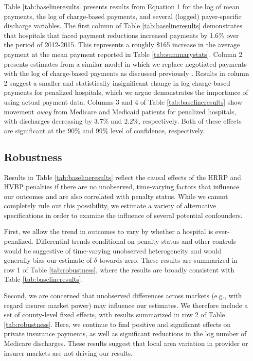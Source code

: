 \documentclass[12pt]{article}
\begin{document}
Table \ref{tab:baselineresults} presents results from Equation 1 for the log of mean payments, the log of charge-based payments, and several (logged) payer-specific discharge variables. The first column of Table \ref{tab:baselineresults} demonstrates that hospitals that faced payment reductions increased payments by 1.6$\%$ over the period of 2012-2015.  This represents a roughly $\$$165 increase in the average payment at the mean payment reported in Table \ref{tab:summarystats}.  Column 2 presents estimates from a similar model in which we replace negotiated payments with the log of charge-based payments as discussed previously \citep{dafny2009,lewis2015,schmitt2017,dranove2017}. Results in column 2 suggest a smaller and statistically insignificant change in log charge-based payments for penalized hospitals, which we argue demonstrates the importance of using actual payment data.  Columns 3 and 4 of Table \ref{tab:baselineresults} show movement \textit{away} from Medicare and Medicaid patients for penalized hospitals, with discharges decreasing by 3.7$\%$ and 2.2$\%$, respectively.  Both of these effects are significant at the 90$\%$ and 99\% level of confidence, respectively.

\subsection{Robustness}
Results in Table \ref{tab:baselineresults} reflect the causal effects of the HRRP and HVBP penalties if there are no unobserved, time-varying factors that influence our outcomes and are also correlated with penalty status.  While we cannot completely rule out this possibility, we estimate a variety of alternative specifications in order to examine the influence of several potential confounders.

First, we allow the trend in outcomes to vary by whether a hospital is ever-penalized. Differential trends conditional on penalty status and other controls would be suggestive of time-varying unobserved heterogeneity and would generally bias our estimate of $\delta$ towards zero.  These results are summarized in row 1 of Table \ref{tab:robustness}, where the results are broadly consistent with Table \ref{tab:baselineresults}.

Second, we are concerned that unobserved differences across markets (e.g., with regard insurer market power) may influence our estimates. We therefore include a set of county-level fixed effects, with results summarized in row 2 of Table \ref{tab:robustness}. Here, we continue to find positive and significant effects on private insurance payments, as well as significant reductions in the log number of Medicare discharges. These results suggest that local area variation in provider or insurer markets are not driving our results.
\end{document}
